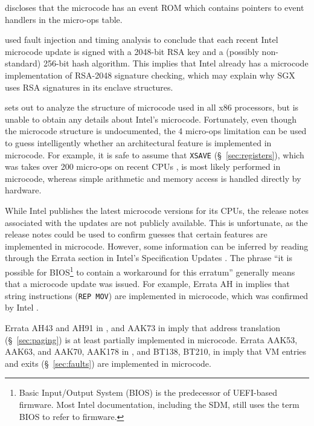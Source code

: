 \cite{intel1999events} discloses that the microcode has an event ROM which
contains pointers to event handlers in the micro-ops table.

\cite{hawkes2012microcode} used fault injection and timing analysis to conclude
that each recent Intel microcode update is signed with a 2048-bit RSA key and
a (possibly non-standard) 256-bit hash algorithm. This implies that Intel
already has a microcode implementation of RSA-2048 signature checking, which
may explain why SGX uses RSA signatures in its enclave structures.

\cite{chen2014microcode} sets out to analyze the structure of microcode used in
all x86 processors, but is unable to obtain any details about Intel's
microcode. Fortunately, even though the microcode structure is undocumented,
the 4 micro-ops limitation can be used to guess intelligently whether an
architectural feature is implemented in microcode. For example, it is safe to
assume that \texttt{XSAVE} (\S~\ref{sec:registers}), which was takes over 200
micro-ops on recent CPUs \cite{fog2014microops}, is most likely performed in
microcode, whereas simple arithmetic and memory access is handled directly by
hardware.

While Intel publishes the latest microcode versions for its CPUs, the release
notes associated with the updates are not publicly available. This is
unfortunate, as the release notes could be used to confirm guesses that certain
features are implemented in microcode. However, some information can be
inferred by reading through the Errata section in Intel's Specification Updates
\cite{intel2010errata, intel2015errata, intel2015errata2}. The phrase ``it is
possible for BIOS\footnote{Basic Input/Output System (BIOS)
is the predecessor of UEFI-based firmware. Most Intel documentation, including
the SDM, still uses the term BIOS to refer to firmware.} to contain a
workaround for this erratum'' generally means that a microcode update was
issued. For example, Errata AH in \cite{intel2010errata} implies that string
instructions (\texttt{REP MOV}) are implemented in microcode, which was
confirmed by Intel \cite{abraham2006repmov}.

Errata AH43 and AH91 in \cite{intel2010errata}, and AAK73 in
\cite{intel2015errata} imply that address translation (\S~\ref{sec:paging}) is
at least partially implemented in microcode. Errata AAK53, AAK63, and AAK70,
AAK178 in \cite{intel2015errata}, and BT138, BT210,  in \cite{intel2015errata2}
imply that VM entries and exits (\S~\ref{sec:faults}) are implemented in
microcode.
